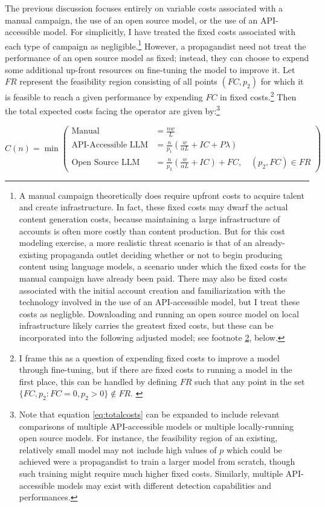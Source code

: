 \documentclass{article}
\begin{document}
The previous discussion focuses entirely on variable costs associated with a manual campaign, the use of an open source model, or the use of an API-accessible model. For simplicitly, I have treated the fixed costs associated with each type of campaign as negligible.\footnote{A manual campaign theoretically does require upfront costs to acquire talent and create infrastructure. In fact, these fixed costs may dwarf the actual content generation costs, because maintaining a large infrastructure of accounts is often more costly than content production. But for this cost modeling exercise, a more realistic threat scenario is that of an already-existing propaganda outlet deciding whether or not to begin producing content using language models, a scenario under which the fixed costs for the manual campaign have already been paid. There may also be fixed costs associated with the initial account creation and familiarization with the technology involved in the use of an API-accessible model, but I treat these costs as negligble. Downloading and running an open source model on local infrastructure likely carries the greatest fixed costs, but these can be incorporated into the following adjusted model; see footnote \ref{feasibilityset}, below.} However, a propagandist need not treat the performance of an open source model as fixed; instead, they can choose to expend some additional up-front resources on fine-tuning the model to improve it. Let $FR$ represent the feasibility region consisting of all points $(FC, p_2)$ for which it is feasible to reach a given performance by expending $FC$ in fixed costs.\footnote{I frame this as a question of expending fixed costs to improve a model through fine-tuning, but if there are fixed costs to running a model in the first place, this can be handled by defining $FR$ such that any point in the set $\{ FC, p_2 : FC = 0, p_2 > 0 \} \notin FR$. \label{feasibilityset}} Then the total expected costs facing the operator are given by:\footnote{Note that equation \ref{eq:totalcosts} can be expanded to include relevant comparisons of multiple API-accessible models or multiple locally-running open source models. For instance, the feasibility region of an existing, relatively small model may not include high values of $p$ which could be achieved were a propagandist to train a larger model from scratch, though such training might require much higher fixed costs. Similarly, multiple API-accessible models may exist with different detection capabilities and performances.}

\begin{equation}
  \label{eq:totalcosts}
  C(n) = \min \left(
  \begin{aligned}
    \text{Manual} &= \frac{nw}{L} \\
    \text{API-Accessible LLM} &= \frac{n}{p_{1}} \left( \frac{w}{\alpha L} + IC + P \lambda \right) \\
    \text{Open Source LLM} &= \frac{n}{p_{2}} \left( \frac{w}{\alpha L} + IC \right) + FC, \quad (p_2, FC) \in FR
  \end{aligned}
  \right)
\end{equation}
\end{document}
